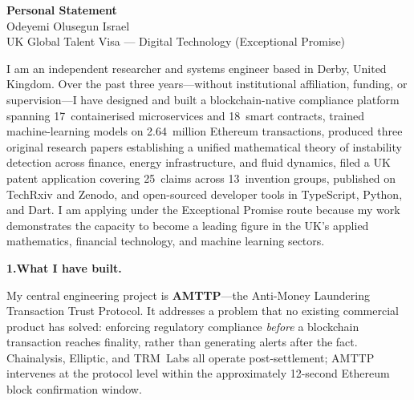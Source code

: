 \documentclass[12pt,a4paper]{article}
\begin{document}
\begin{center}
{\Large\bfseries Personal Statement}\\[4pt]
{\large Odeyemi Olusegun Israel}\\[2pt]
{\normalsize UK Global Talent Visa --- Digital Technology (Exceptional Promise)}
\end{center}

\bigskip

I am an independent researcher and systems engineer based in Derby,
United Kingdom.  Over the past three years---without institutional
affiliation, funding, or supervision---I have designed and built a
blockchain-native compliance platform spanning 17~containerised
microservices and 18~smart contracts, trained machine-learning models on
2.64~million Ethereum transactions, produced three original research
papers establishing a unified mathematical theory of instability
detection across finance, energy infrastructure, and fluid dynamics,
filed a UK patent application covering 25~claims across 13~invention
groups, published on TechRxiv and Zenodo, and open-sourced developer
tools in TypeScript, Python, and Dart.  I am applying under the
Exceptional Promise route because my work demonstrates the capacity to
become a leading figure in the UK's applied mathematics, financial
technology, and machine learning sectors.


\textbf{1.\enspace What I have built.}

My central engineering project is \textbf{AMTTP}---the Anti-Money
Laundering Transaction Trust Protocol.  It addresses a problem that
no existing commercial product has solved: enforcing regulatory compliance
\textit{before} a blockchain transaction reaches finality, rather than
generating alerts after the fact.  Chainalysis, Elliptic, and TRM~Labs
all operate post-settlement; AMTTP intervenes at the protocol level
within the approximately 12-second Ethereum block confirmation window.
\end{document}
